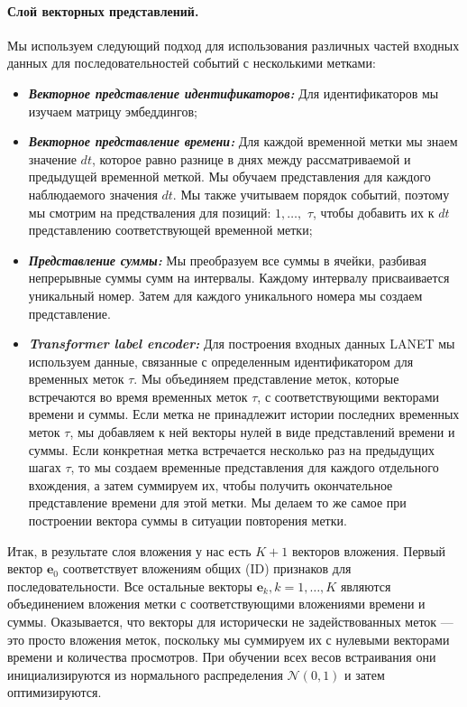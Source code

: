 \documentclass[a4paper, 12pt]{article} %
\newcommand{\vecE}{\mathbf{e}}
\begin{document}
\paragraph{\textbf{Слой векторных представлений.}} Мы используем следующий подход для использования различных частей входных данных для последовательностей событий с несколькими метками:
\begin{itemize}
    \item \textbf{\emph{Векторное представление идентификаторов:}} Для идентификаторов мы изучаем матрицу эмбеддингов;
    \item \textbf{\emph{Векторное представление времени:}} Для каждой временной метки мы знаем значение $dt$, которое равно разнице в днях между рассматриваемой и предыдущей временной меткой. Мы обучаем представления для каждого наблюдаемого значения $dt$. Мы также учитываем порядок событий, поэтому мы смотрим на предстваления для позиций: $1, \dots,$ \textit{$\tau$}, чтобы добавить их к $dt$ представлению соответствующей временной метки; 
    \item \textbf{\emph{Представление суммы:}} Мы преобразуем все суммы в ячейки, разбивая непрерывные суммы сумм на интервалы. Каждому интервалу присваивается уникальный номер. Затем для каждого уникального номера мы создаем представление.
    \item \textbf{\emph{Transformer label encoder:}} Для построения входных данных LANET мы используем данные, связанные с определенным идентификатором для временных меток \textit{$\tau$}. Мы объединяем представление меток, которые встречаются во время временных меток \textit{$\tau$}, с соответствующими векторами времени и суммы. Если метка не принадлежит истории последних временных меток \textit{$\tau$}, мы добавляем к ней векторы нулей в виде представлений времени и суммы. Если конкретная метка встречается несколько раз на предыдущих шагах \textit{$\tau$}, то мы создаем временные представления для каждого отдельного вхождения, а затем суммируем их, чтобы получить окончательное представление времени для этой метки. Мы делаем то же самое при построении вектора суммы в ситуации повторения метки.
\end{itemize}

Итак, в результате слоя вложения у нас есть $K + 1$ векторов вложения. 
Первый вектор $\vecE_0$ соответствует вложениям общих (ID) признаков для последовательности.
Все остальные векторы $\vecE_k, k = 1, \dots, K$ являются объединением вложения метки с соответствующими вложениями времени и суммы. Оказывается, что векторы для исторически не задействованных меток --- это просто вложения меток, поскольку мы суммируем их с нулевыми векторами времени и количества просмотров.
При обучении всех весов встраивания они инициализируются из нормального распределения $\mathcal{N}(0, 1)$ и затем оптимизируются.
\end{document}
